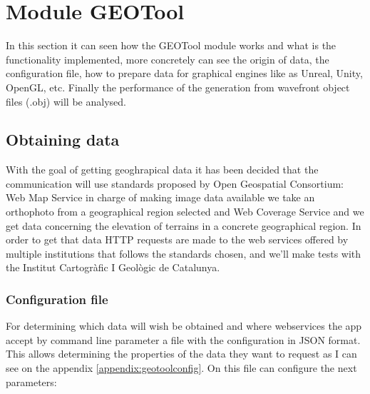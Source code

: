 \documentclass[10pt,a4paper,twocolumn,twoside]{article}
\begin{document}
\section{Module GEOTool}

In this section it can seen how the GEOTool module works and what is the functionality implemented, more concretely can see the origin of data, the configuration file, how to prepare data for graphical engines like as Unreal, Unity, OpenGL, etc. Finally the performance of the generation from wavefront object files (.obj) will be analysed.

\subsection{Obtaining data}
\label{getdata}

With the goal of getting geoghrapical data it has been decided that the communication will use standards proposed by Open Geospatial Consortium\cite{ogc}: Web Map Service\cite{wms} in charge of making image data available we take an orthophoto from a geographical region selected and Web Coverage Service\cite{wms} and we get data concerning the elevation of terrains in a concrete geographical region. In order to get that data HTTP requests are made to the web services offered by multiple institutions that follows the standards chosen, and we'll make tests with the Institut Cartogràfic I Geològic de Catalunya\cite{icgc}.

\subsubsection{Configuration file}

For determining which data will wish be obtained and where webservices the app accept by command line parameter a file with the configuration in JSON format. This allows determining the properties of the data they want to request as I can see on the appendix \ref{appendix:geotoolconfig}. On this file can configure the next parameters:
\end{document}
